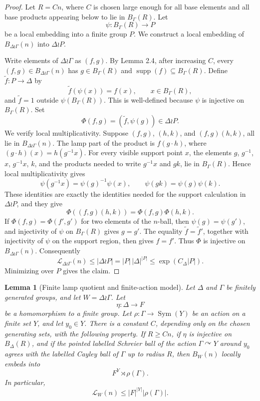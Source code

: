 \documentclass[11pt]{article}
\newcommand{\LEF}{\mathcal L}
\newcommand{\supp}{\operatorname{supp}}
\newcommand{\Sym}{\operatorname{Sym}}
\newtheorem{lemma}[theorem]{Lemma}
\begin{document}
\begin{proof}
Let \(R=Cn\), where \(C\) is chosen large enough for all base elements and all base products appearing below to lie in \(B_\Gamma(R)\). Let
\[
\psi:B_\Gamma(R)\to P
\]
be a local embedding into a finite group \(P\). We construct a local embedding of \(B_{\Delta\wr\Gamma}(n)\) into \(\Delta\wr P\).

Write elements of \(\Delta\wr\Gamma\) as \((f,g)\). By Lemma 2.4, after increasing \(C\), every \((f,g)\in B_{\Delta\wr\Gamma}(n)\) has \(g\in B_\Gamma(R)\) and \(\supp(f)\subseteq B_\Gamma(R)\). Define \(\tilde f:P\to\Delta\) by
\[
\tilde f(\psi(x))=f(x),\qquad x\in B_\Gamma(R),
\]
and \(\tilde f=1\) outside \(\psi(B_\Gamma(R))\). This is well-defined because \(\psi\) is injective on \(B_\Gamma(R)\). Set
\[
\Phi(f,g)=(\tilde f,\psi(g))\in\Delta\wr P.
\]
We verify local multiplicativity. Suppose \((f,g)\), \((h,k)\), and \((f,g)(h,k)\), all lie in \(B_{\Delta\wr\Gamma}(n)\). The lamp part of the product is \(f(g\cdot h)\), where \((g\cdot h)(x)=h(g^{-1}x)\). For every visible support point \(x\), the elements \(g\), \(g^{-1}\), \(x\), \(g^{-1}x\), \(k\), and the products needed to write \(g^{-1}x\) and \(gk\), lie in \(B_\Gamma(R)\). Hence local multiplicativity gives
\[
\psi(g^{-1}x)=\psi(g)^{-1}\psi(x),\qquad \psi(gk)=\psi(g)\psi(k).
\]
These identities are exactly the identities needed for the support calculation in \(\Delta\wr P\), and they give
\[
\Phi((f,g)(h,k))=\Phi(f,g)\Phi(h,k).
\]
If \(\Phi(f,g)=\Phi(f',g')\) for two elements of the \(n\)-ball, then \(\psi(g)=\psi(g')\), and injectivity of \(\psi\) on \(B_\Gamma(R)\) gives \(g=g'\). The equality \(\tilde f=\tilde f'\), together with injectivity of \(\psi\) on the support region, then gives \(f=f'\). Thus \(\Phi\) is injective on \(B_{\Delta\wr\Gamma}(n)\). Consequently
\[
\LEF_{\Delta\wr\Gamma}(n)\le |\Delta\wr P|=|P|\,|\Delta|^{|P|}\le \exp(C_\Delta |P|).
\]
Minimizing over \(P\) gives the claim.
\end{proof}

\begin{lemma}[Finite lamp quotient and finite-action model]
Let \(\Delta\) and \(\Gamma\) be finitely generated groups, and let \(W=\Delta\wr\Gamma\). Let
\[
\eta:\Delta\to F
\]
be a homomorphism to a finite group. Let \(\rho:\Gamma\to\Sym(Y)\) be an action on a finite set \(Y\), and let \(y_0\in Y\). There is a constant \(C\), depending only on the chosen generating sets, with the following property. If \(R\ge Cn\), if \(\eta\) is injective on \(B_\Delta(R)\), and if the pointed labelled Schreier ball of the action \(\Gamma\curvearrowright Y\) around \(y_0\) agrees with the labelled Cayley ball of \(\Gamma\) up to radius \(R\), then \(B_W(n)\) locally embeds into
\[
F^Y\rtimes \rho(\Gamma).
\]
In particular,
\[
\LEF_W(n)\le |F|^{|Y|}|\rho(\Gamma)|.
\]
\end{lemma}
\end{document}
